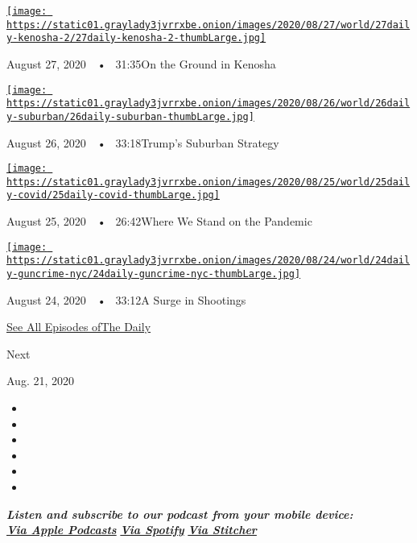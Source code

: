 \href{https://www.nytimes3xbfgragh.onion/2020/08/27/podcasts/the-daily/kenosha-wisconsin-protests.html?action=click\&module=audio-series-bar\&region=header\&pgtype=Article}{\texttt{[image: https://static01.graylady3jvrrxbe.onion/images/2020/08/27/world/27daily-kenosha-2/27daily-kenosha-2-thumbLarge.jpg]}}

August 27, 2020~~•~ 31:35On the Ground in Kenosha

\href{https://www.nytimes3xbfgragh.onion/2020/08/26/podcasts/the-daily/republican-convention-suburbs.html?action=click\&module=audio-series-bar\&region=header\&pgtype=Article}{\texttt{[image: https://static01.graylady3jvrrxbe.onion/images/2020/08/26/world/26daily-suburban/26daily-suburban-thumbLarge.jpg]}}

August 26, 2020~~•~ 33:18Trump's Suburban Strategy

\href{https://www.nytimes3xbfgragh.onion/2020/08/25/podcasts/the-daily/coronavirus-plasma-reinfection.html?action=click\&module=audio-series-bar\&region=header\&pgtype=Article}{\texttt{[image: https://static01.graylady3jvrrxbe.onion/images/2020/08/25/world/25daily-covid/25daily-covid-thumbLarge.jpg]}}

August 25, 2020~~•~ 26:42Where We Stand on the Pandemic

\href{https://www.nytimes3xbfgragh.onion/2020/08/24/podcasts/the-daily/gun-violence-new-york.html?action=click\&module=audio-series-bar\&region=header\&pgtype=Article}{\texttt{[image: https://static01.graylady3jvrrxbe.onion/images/2020/08/24/world/24daily-guncrime-nyc/24daily-guncrime-nyc-thumbLarge.jpg]}}

August 24, 2020~~•~ 33:12A Surge in Shootings

\href{https://www.nytimes3xbfgragh.onion/column/the-daily}{See All
Episodes ofThe Daily}

Next

Aug. 21, 2020

\begin{itemize}
\item
\item
\item
\item
\item
\item
\end{itemize}

\emph{\textbf{Listen and subscribe to our podcast from your mobile
device:}}\\
\textbf{\href{https://itunes.apple.com/us/podcast/the-daily/id1200361736?mt=2}{\emph{Via
Apple Podcasts}}} \emph{\textbf{\textbar{}}}
\textbf{\href{https://open.spotify.com/show/3IM0lmZxpFAY7CwMuv9H4g?si=SfuMSC55R1qprFsRZU3_zw}{\emph{Via
Spotify}}} \emph{\textbf{\textbar{}}}
\textbf{\href{http://www.stitcher.com/podcast/the-new-york-times/the-daily-10}{\emph{Via
Stitcher}}}

